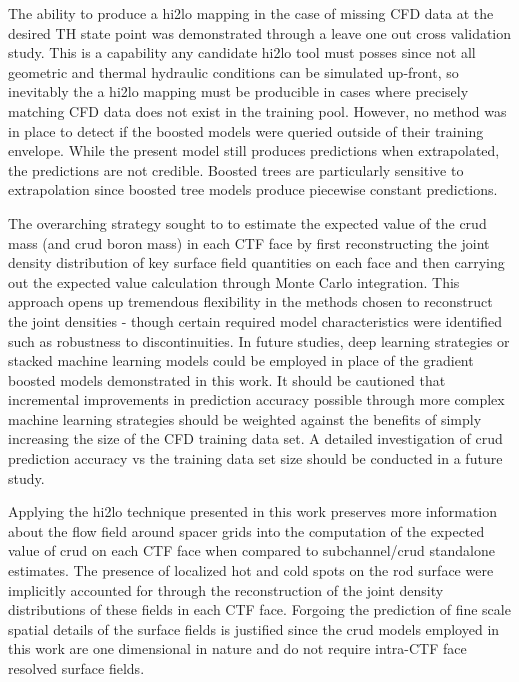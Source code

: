 The ability to produce a hi2lo mapping in the case of missing CFD data at the desired TH state point was demonstrated through a leave one out cross validation study.  This is a capability any candidate hi2lo tool must posses since not all geometric and thermal hydraulic conditions can be simulated up-front, so inevitably the a hi2lo mapping must be producible in cases where precisely matching CFD data does not exist in the training pool. However, no method was in place to detect if the boosted models were queried outside of their training envelope.  While the present model still produces predictions when extrapolated, the predictions are not credible.  Boosted trees are particularly sensitive to extrapolation since boosted tree models produce piecewise constant predictions.

The overarching strategy sought to to estimate the expected value of the crud mass (and crud boron mass) in each CTF face by first reconstructing the joint density distribution of key surface field quantities on each face and then carrying out the expected value calculation through Monte Carlo integration.  This approach opens up tremendous flexibility in the methods chosen to reconstruct the joint densities - though certain required model characteristics were identified such as robustness to discontinuities.  In future studies, deep learning strategies or stacked machine learning models could be employed in place of the gradient boosted models demonstrated in this work.  It should be cautioned that incremental improvements in prediction accuracy possible through more complex  machine learning strategies should be weighted against the benefits of simply increasing the size of the CFD training data set.  A detailed investigation of crud prediction accuracy vs the training data set size should be conducted in a future study.

Applying the hi2lo technique presented in this work preserves more information about the flow field around spacer grids into the computation of the expected value of crud on each CTF face when compared to subchannel/crud standalone estimates.  The presence of localized hot and cold spots on the rod surface were implicitly accounted for through the reconstruction of the joint density distributions of these fields in each CTF face.  Forgoing the prediction of fine scale spatial details of the surface fields is justified since the crud models employed in this work are one dimensional in nature and do not require intra-CTF face resolved surface fields.

